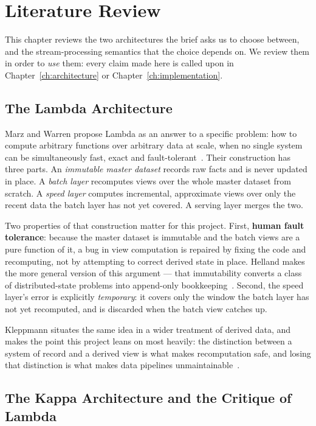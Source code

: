 \chapter{Literature Review}
\label{ch:literature}

This chapter reviews the two architectures the brief asks us to choose
between, and the stream-processing semantics that the choice depends on.
We review them in order to \emph{use} them: every claim made here is
called upon in Chapter~\ref{ch:architecture} or
Chapter~\ref{ch:implementation}.

\section{The Lambda Architecture}
\label{sec:lit-lambda}

Marz and Warren propose Lambda as an answer to a specific
problem: how to compute arbitrary functions over arbitrary data at
scale, when no single system can be simultaneously fast, exact and
fault-tolerant~\cite{marz2015bigdata}. Their construction has three
parts. An \emph{immutable master dataset} records raw facts and is never
updated in place. A \emph{batch layer} recomputes views over the whole
master dataset from scratch. A \emph{speed layer} computes incremental,
approximate views over only the recent data the batch layer has not yet
covered. A serving layer merges the two.

Two properties of that construction matter for this project. First,
\textbf{human fault tolerance}: because the master dataset is immutable
and the batch views are a pure function of it, a bug in view computation
is repaired by fixing the code and recomputing, not by attempting to
correct derived state in place. Helland makes the more general version of
this argument --- that immutability converts a class of distributed-state
problems into append-only bookkeeping~\cite{helland2015immutability}.
Second, the speed layer's error is explicitly \emph{temporary}: it covers
only the window the batch layer has not yet recomputed, and is discarded
when the batch view catches up.

Kleppmann situates the same idea in a wider treatment of derived
data, and makes the point this project leans on most heavily: the
distinction between a system of record and a derived view is what makes
recomputation safe, and losing that distinction is what makes data
pipelines unmaintainable~\cite{kleppmann2017ddia}.

\section{The Kappa Architecture and the Critique of Lambda}
\label{sec:lit-kappa}

